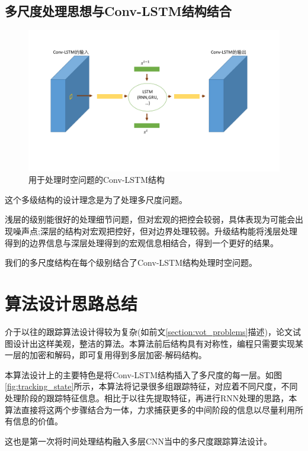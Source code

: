 \subsection{多尺度处理思想与Conv-LSTM结构结合} \label{section:multiscale}
\par
\begin{figure}[htbp!]
    \centering
    \includegraphics[width = 1.\textwidth]{chap/img/crnn.pdf}
    \caption{用于处理时空问题的Conv-LSTM结构}
    \label{fig:conv_lstm_arch}
\end{figure}
\par
这个多级结构的设计理念是为了处理多尺度问题。
\par
浅层的级别能很好的处理细节问题，但对宏观的把控会较弱，具体表现为可能会出现噪声点;深层的结构对宏观把控好，但对边界处理较弱。升级结构能将浅层处理得到的边界信息与深层处理得到的宏观信息相结合，得到一个更好的结果。
\par
我们的多尺度结构在每个级别结合了Conv-LSTM结构处理时空问题。

\section{算法设计思路总结}
介于以往的跟踪算法设计得较为复杂(如前文\ref{section:vot_problems}描述)，论文试图设计出这样美观，整洁的算法。本算法前后结构具有对称性，编程只需要实现某一层的加密和解码，即可复用得到多层加密-解码结构。
\par
本算法设计上的主要特色是将Conv-LSTM结构插入了多尺度的每一层。如图\ref{fig:tracking_state}所示，本算法将记录很多组跟踪特征，对应着不同尺度，不同处理阶段的跟踪特征信息。相比于以往先提取特征，再进行RNN处理的思路，本算法直接将这两个步骤结合为一体，力求捕获更多的中间阶段的信息以尽量利用所有信息的价值。
\par
这也是第一次将时间处理结构融入多层CNN当中的多尺度跟踪算法设计。

